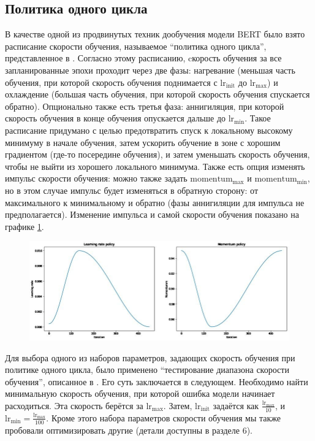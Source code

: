 \documentclass[a4paper,14pt]{extarticle}
\begin{document}
    \subsection{Политика одного цикла}
    В качестве одной из продвинутых техник дообучения модели BERT было взято расписание скорости обучения, называемое ``политика одного цикла'', представленное в \cite{one-cycle-policy}. Согласно этому расписанию, cкорость обучения за все запланированные эпохи проходит через две фазы: нагревание (меньшая часть обучения, при которой скорость обучения поднимается с $\text{lr}_\text{init}$ до $\text{lr}_\text{max}$) и охлаждение (большая часть обучения, при которой скорость обучения спускается обратно). Опционально также есть третья фаза: аннигиляция, при которой скорость обучения в конце обучения опускается дальше до $\text{lr}_\text{min}$. Такое расписание придумано с целью предотвратить спуск к локальному высокому минимуму в начале обучения, затем ускорить обучение в зоне с хорошим градиентом (где-то посередине обучения), и затем уменьшать скорость обучения, чтобы не выйти из хорошего локального минимума. Также есть опция изменять импульс скорости обучения: можно также задать $\text{momentum}_\text{max}$ и $\text{momentum}_\text{min}$, но в этом случае импульс будет изменяться в обратную сторону: от максимального к минимальному и обратно (фазы аннигиляции для импульса не предполагается). Изменение импульса и самой скорости обучения показано на графике \ref{fig:one-cycle-policy}.
    \begin{figure}[h!]
        \centering
        \includegraphics*[width=\linewidth]{one-cycle-policy.jpg}
        \caption{}
        \label{fig:one-cycle-policy}
    \end{figure}
    
    Для выбора одного из наборов параметров, задающих скорость обучения при политике одного цикла, было применено ``тестирование диапазона скорости обучения'', описанное в \cite{lr-range-test}. Его суть заключается в следующем. Необходимо найти минимальную скорость обучения, при которой ошибка модели начинает расходиться. Эта скорость берётся за $\text{lr}_\text{max}$. Затем, $\text{lr}_\text{init}$ задаётся как $\frac{\text{lr}_\text{max}}{10}$, и $\text{lr}_\text{min} = \frac{\text{lr}_\text{max}}{100}$. Кроме этого набора параметров скорости обучения мы также пробовали оптимизировать другие (детали доступны в разделе 6).
    
\end{document}
